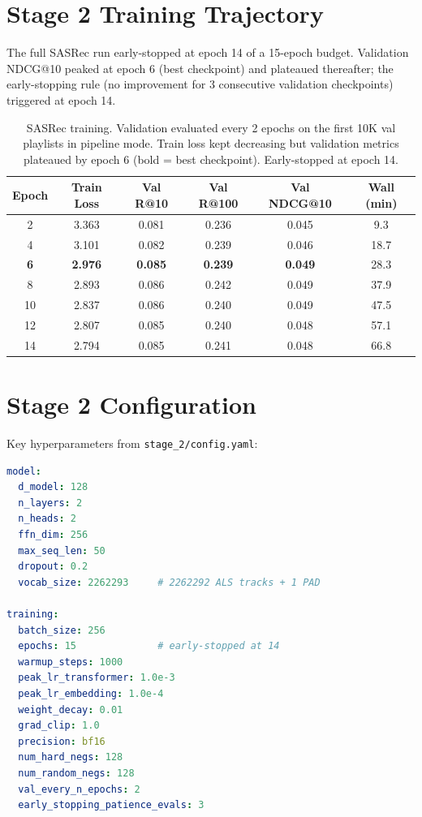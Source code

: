\documentclass[11pt,a4paper]{article}
\begin{document}
\section{Stage 2 Training Trajectory}

The full SASRec run early-stopped at epoch 14 of a 15-epoch budget. Validation NDCG@10 peaked at epoch 6 (best checkpoint) and plateaued thereafter; the early-stopping rule (no improvement for 3 consecutive validation checkpoints) triggered at epoch 14.

\begin{table}[H]
\centering
\begin{tabular}{cccccc}
\toprule
\textbf{Epoch} & \textbf{Train Loss} & \textbf{Val R@10} & \textbf{Val R@100} & \textbf{Val NDCG@10} & \textbf{Wall (min)} \\
\midrule
2 & 3.363 & 0.081 & 0.236 & 0.045 & 9.3 \\
4 & 3.101 & 0.082 & 0.239 & 0.046 & 18.7 \\
\textbf{6} & \textbf{2.976} & \textbf{0.085} & \textbf{0.239} & \textbf{0.049} & 28.3 \\
8 & 2.893 & 0.086 & 0.242 & 0.049 & 37.9 \\
10 & 2.837 & 0.086 & 0.240 & 0.049 & 47.5 \\
12 & 2.807 & 0.085 & 0.240 & 0.048 & 57.1 \\
14 & 2.794 & 0.085 & 0.241 & 0.048 & 66.8 \\
\bottomrule
\end{tabular}
\caption{SASRec training. Validation evaluated every 2 epochs on the first 10K val playlists in pipeline mode. Train loss kept decreasing but validation metrics plateaued by epoch 6 (bold = best checkpoint). Early-stopped at epoch 14.}
\label{tab:stage2_training}
\end{table}

\section{Stage 2 Configuration}

Key hyperparameters from \texttt{stage\_2/config.yaml}:

\begin{lstlisting}[language=yaml]
model:
  d_model: 128
  n_layers: 2
  n_heads: 2
  ffn_dim: 256
  max_seq_len: 50
  dropout: 0.2
  vocab_size: 2262293     # 2262292 ALS tracks + 1 PAD

training:
  batch_size: 256
  epochs: 15              # early-stopped at 14
  warmup_steps: 1000
  peak_lr_transformer: 1.0e-3
  peak_lr_embedding: 1.0e-4
  weight_decay: 0.01
  grad_clip: 1.0
  precision: bf16
  num_hard_negs: 128
  num_random_negs: 128
  val_every_n_epochs: 2
  early_stopping_patience_evals: 3
\end{lstlisting}
\end{document}
